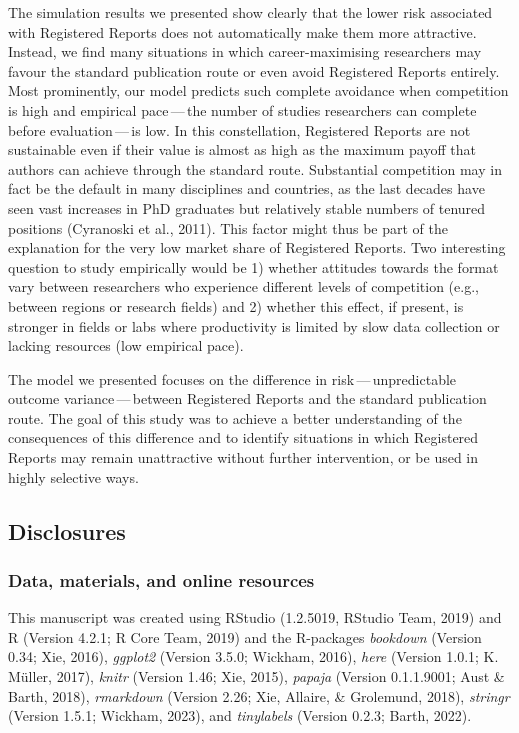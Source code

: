 \documentclass[
  ,man,mask,floatsintext]{apa6}
\begin{document}
The simulation results we presented show clearly that the lower risk associated with Registered Reports does not automatically make them more attractive.
Instead, we find many situations in which career-maximising researchers may favour the standard publication route or even avoid Registered Reports entirely.
Most prominently, our model predicts such complete avoidance when competition is high and empirical pace\(\,\)---\(\,\)the number of studies researchers can complete before evaluation\(\,\)---\(\,\)is low.
In this constellation, Registered Reports are not sustainable even if their value is almost as high as the maximum payoff that authors can achieve through the standard route.
Substantial competition may in fact be the default in many disciplines and countries, as the last decades have seen vast increases in PhD graduates but relatively stable numbers of tenured positions (Cyranoski et al., 2011).
This factor might thus be part of the explanation for the very low market share of Registered Reports.
Two interesting question to study empirically would be 1) whether attitudes towards the format vary between researchers who experience different levels of competition (e.g., between regions or research fields) and 2) whether this effect, if present, is stronger in fields or labs where productivity is limited by slow data collection or lacking resources (low empirical pace).

The model we presented focuses on the difference in risk\(\,\)---\(\,\)unpredictable outcome variance\(\,\)---\(\,\)between Registered Reports and the standard publication route.
The goal of this study was to achieve a better understanding of the consequences of this difference and to identify situations in which Registered Reports may remain unattractive without further intervention, or be used in highly selective ways.

\hypertarget{disclosures}{%
\subsection{Disclosures}\label{disclosures}}

\hypertarget{data-materials-and-online-resources}{%
\subsubsection{Data, materials, and online resources}\label{data-materials-and-online-resources}}

This manuscript was created using RStudio (1.2.5019, RStudio Team, 2019) and R (Version 4.2.1; R Core Team, 2019) and the R-packages \emph{bookdown} (Version 0.34; Xie, 2016), \emph{ggplot2} (Version 3.5.0; Wickham, 2016), \emph{here} (Version 1.0.1; K. Müller, 2017), \emph{knitr} (Version 1.46; Xie, 2015), \emph{papaja} (Version 0.1.1.9001; Aust \& Barth, 2018), \emph{rmarkdown} (Version 2.26; Xie, Allaire, \& Grolemund, 2018), \emph{stringr} (Version 1.5.1; Wickham, 2023), and \emph{tinylabels} (Version 0.2.3; Barth, 2022).
\end{document}
